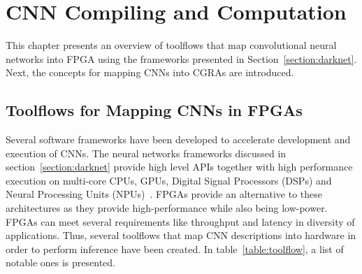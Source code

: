 \chapter{CNN Compiling and Computation}
\label{chapter:CNNVersat}

This chapter presents an overview of toolflows that map convolutional neural
networks into FPGA using the frameworks presented in
Section~\ref{section:darknet}. Next, the concepts for mapping CNNs
into CGRAs are introduced.

%

\section{Toolflows for Mapping CNNs in FPGAs}
\label{section:toolflow}

Several software frameworks have been developed to accelerate development and
execution of CNNs. The neural networks frameworks discussed in
section~\ref{section:darknet} provide high level APIs together with high
performance execution on multi-core CPUs, GPUs, Digital Signal Processors (DSPs)
and Neural Processing Units (NPUs)~\cite{smartphones}. FPGAs provide an
alternative to these architectures as they provide high-performance while also
being low-power. FPGAs can meet several requirements like throughput and latency
in diversity of applications. Thus, several toolflows that map CNN descriptions
into hardware in order to perform inference have been created. In
table~\ref{table:toolflow}, a list of notable ones is presented.

